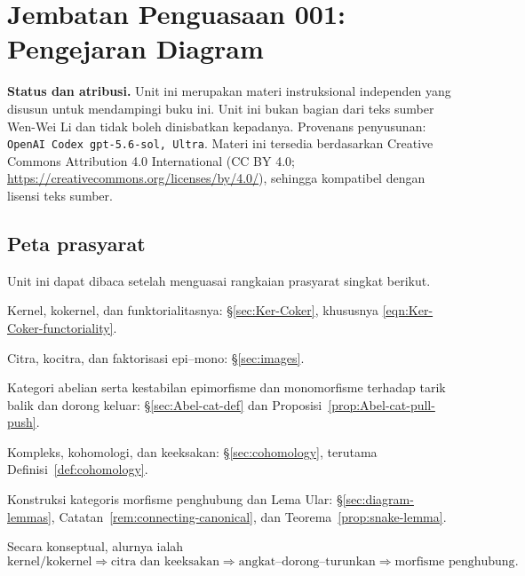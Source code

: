 
\section*{Jembatan Penguasaan 001: Pengejaran Diagram}
\hypertarget{o014.mastery.diagram-chasing.001}{ }
\label{mastery:diagram-chasing-001}

\noindent\textbf{Status dan atribusi.}
Unit ini merupakan materi instruksional independen yang disusun untuk
mendampingi buku ini. Unit ini bukan bagian dari teks sumber Wen-Wei Li dan
tidak boleh dinisbatkan kepadanya. Provenans penyusunan:
\texttt{OpenAI Codex gpt-5.6-sol, Ultra}. Materi ini tersedia berdasarkan
Creative Commons Attribution 4.0 International
(CC BY 4.0; \url{https://creativecommons.org/licenses/by/4.0/}), sehingga
kompatibel dengan lisensi teks sumber.

\subsection*{Peta prasyarat}

Unit ini dapat dibaca setelah menguasai rangkaian prasyarat singkat berikut.
\begin{compactitem}
	\item Kernel, kokernel, dan funktorialitasnya:
	\S\ref{sec:Ker-Coker}, khususnya
	\eqref{eqn:Ker-Coker-functoriality}.
	\item Citra, kocitra, dan faktorisasi epi--mono:
	\S\ref{sec:images}.
	\item Kategori abelian serta kestabilan epimorfisme dan monomorfisme
	terhadap tarik balik dan dorong keluar:
	\S\ref{sec:Abel-cat-def} dan
	Proposisi~\ref{prop:Abel-cat-pull-push}.
	\item Kompleks, kohomologi, dan keeksakan:
	\S\ref{sec:cohomology}, terutama
	Definisi~\ref{def:cohomology}.
	\item Konstruksi kategoris morfisme penghubung dan Lema Ular:
	\S\ref{sec:diagram-lemmas}, Catatan~\ref{rem:connecting-canonical}, dan
	Teorema~\ref{prop:snake-lemma}.
\end{compactitem}
Secara konseptual, alurnya ialah
\[
	\text{kernel/kokernel}
	\Longrightarrow \text{citra dan keeksakan}
	\Longrightarrow \text{angkat--dorong--turunkan}
	\Longrightarrow \text{morfisme penghubung}.
\]

